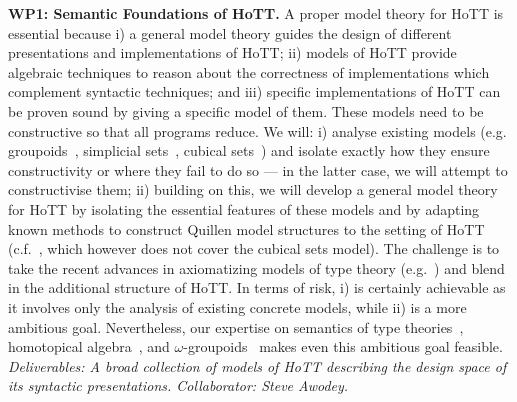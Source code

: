 \documentclass[a4paper,11pt]{article}
\begin{document}
{\bf WP1: Semantic Foundations of HoTT.}  A proper model theory for
HoTT is essential because i) a general model theory guides the design
of different presentations and implementations of HoTT; ii) models of
HoTT provide algebraic techniques to reason about the correctness of
implementations which complement syntactic techniques; and iii)
specific implementations of HoTT can be proven sound by giving a
specific model of them.  These models need to be constructive so that
all programs reduce. %
We will: i) analyse existing
models ({e.g.}  groupoids~\cite{HofmannM:groitt}, simplicial
sets~\cite{KapulkinC:simmuv}, cubical sets~\cite{BezemM:cubsmt}) and
isolate exactly how they ensure constructivity or where they fail to
do so --- in the latter case, we will attempt to constructivise them;
ii) building on this, we will develop a general model theory for HoTT
by isolating the essential features of these models and by adapting
known methods to construct Quillen model structures to the setting of
HoTT ({c.f.}~\cite{ShulmanM:uniidh}, which however does not cover the
cubical sets model).  The challenge is to take the recent advances in
axiomatizing models of type theory ({e.g.}~\cite{AwodeyS:natmtt}) and
blend in the additional structure of HoTT. In terms of risk, i) is
certainly achievable as it involves only the analysis of existing
concrete models, while ii) is a more ambitious goal. Nevertheless, our
expertise on semantics of type theories~\cite{neil2014relParamDep},
homotopical algebra~\cite{GambinoN:homl2c,GambinoN:weilsh}, and
$\omega$-groupoids~\cite{alti:csl12} makes even this ambitious goal
feasible. {\em Deliverables: A broad collection of models of HoTT
  describing the design space of its syntactic presentations.
  Collaborator: Steve Awodey.  }
\end{document}
